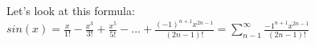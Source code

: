 \documentclass[main.tex]{subfiles}
\begin{document}
    \begin{center}

        Let's look at this formula:
        \vspace{2cm}
		$sin(x) = \frac{x}{1!} - \frac{x^3}{3!} + \frac{x^5}{5!} - ... + \frac{(-1)^{n+1}x^{2n-1}}{(2n-1)!} = \sum_{n-1}^{\infty}\frac{-1^{n+1}x^{2n-1}}{(2n-1)!}$
	\end{center}  
\end{document}
